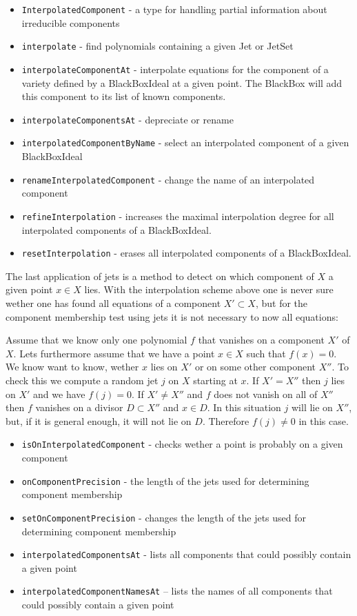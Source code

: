 \documentclass[12pt,a4paper]{amsart}
\theoremstyle{plain}
\theoremstyle{definition}
\begin{document}
\begin{itemize}
\item {\tt InterpolatedComponent} - a type for handling partial information about irreducible components
\item {\tt interpolate} - find polynomials containing a given Jet or JetSet
\item {\tt interpolateComponentAt} - interpolate equations for the component of a variety defined by a BlackBoxIdeal at a given point. The BlackBox will add this component to its list of known components.
\item {\tt interpolateComponentsAt}  - {\color{red} depreciate or rename}
\item {\tt interpolatedComponentByName} - select an interpolated component of a given BlackBoxIdeal
\item {\tt renameInterpolatedComponent} - change the name of an interpolated component
\item {\tt refineInterpolation} - increases the maximal interpolation degree for all interpolated components of a BlackBoxIdeal.
\item {\tt resetInterpolation} - erases all interpolated components of a BlackBoxIdeal.
\end{itemize}


The last application of jets is a method to detect on which component of $X$ a given point $x \in X$ lies. 
With the interpolation scheme above one is never sure wether one has found all equations of a component $X' \subset X$, but for the component membership test using jets it is not necessary to now all equations:

Assume that we know only one polynomial $f$ that vanishes on a component $X'$ of $X$. Lets furthermore assume that we have a point $x \in X$ such that $f(x) = 0$. We know want to know, wether $x$ lies on $X'$ or on some other component $X''$. To check this we compute a random jet $j$ on $X$ starting at $x$. If $X' = X''$ then $j$ lies on $X'$ and we have $f(j) = 0$. If $X' \not= X''$ and $f$ does not vanish on all of $X''$ then $f$ vanishes on a divisor $D \subset X''$ and $x \in D$.  In this situation $j$ will lie on $X''$, but, if it is general enough, it will not lie on $D$. Therefore $f(j) \not=0$ in this case. 

\begin{itemize}
\item {\tt isOnInterpolatedComponent} - checks wether a point is probably on a given component
\item {\tt onComponentPrecision} - the length of the jets used for determining component membership
\item {\tt setOnComponentPrecision} - changes the length of the jets used for determining component membership
\item {\tt interpolatedComponentsAt} - lists all components that could possibly contain a given point
\item {\tt interpolatedComponentNamesAt} -- lists the names of all components that could possibly contain a given point
\end{itemize}
\end{document}
